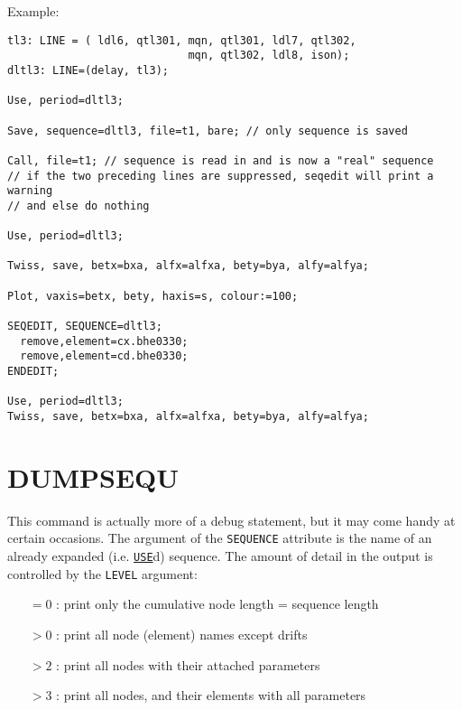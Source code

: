 Example:  
\begin{verbatim}
tl3: LINE = ( ldl6, qtl301, mqn, qtl301, ldl7, qtl302,
                            mqn, qtl302, ldl8, ison);
dltl3: LINE=(delay, tl3);

Use, period=dltl3;

Save, sequence=dltl3, file=t1, bare; // only sequence is saved

Call, file=t1; // sequence is read in and is now a "real" sequence
// if the two preceding lines are suppressed, seqedit will print a warning
// and else do nothing

Use, period=dltl3;

Twiss, save, betx=bxa, alfx=alfxa, bety=bya, alfy=alfya;

Plot, vaxis=betx, bety, haxis=s, colour:=100;

SEQEDIT, SEQUENCE=dltl3;
  remove,element=cx.bhe0330;
  remove,element=cd.bhe0330;
ENDEDIT;

Use, period=dltl3;
Twiss, save, betx=bxa, alfx=alfxa, bety=bya, alfy=alfya;
\end{verbatim}


\section{DUMPSEQU}
\label{sec:dumpsequ}
This command is actually more of a debug statement, but it may come handy at certain
occasions. The argument of the {\tt SEQUENCE} attribute is the name of an
already expanded (i.e. \hyperref[sec:use]{\tt USE}d) sequence. The amount of 
detail in the output is controlled by the {\tt LEVEL} argument:
\begin{itemize}
\item[$=0$ : ]    print only the cumulative node length = sequence length
\item[$>0$ : ]    print all node (element) names except drifts
\item[$>2$ : ]    print all nodes with their attached parameters
\item[$>3$ : ]    print all nodes, and their elements with all parameters
\end{itemize}



